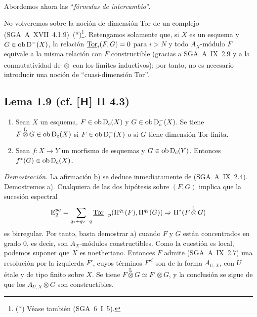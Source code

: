 Abordemos ahora las ``\emph{fórmulas de intercambio}''.

No volveremos sobre la noción de dimensión Tor de un complejo (SGA~A~XVII~4.1.9)~(*)\footnote{(*) Véase también (SGA~6~I~5).}. Retengamos solamente que, si $X$ es un esquema y $G \in \operatorname{ob} \mathrm{D}^{-}(X)$, la relación $\underline{\operatorname{Tor}}_i(F,G) = 0$ para $i > N$ y todo $A_X$-módulo $F$ equivale a la misma relación con $F$ constructible (gracias a SGA~A~IX~2.9 y a la conmutatividad de $\mathop{\otimes}\limits^{\mathrm{L}}$ con los límites inductivos); por tanto, no es necesario introducir una noción de ``cuasi-dimensión Tor''.

\subsection*{Lema 1.9 (cf. [H] II 4.3)}
\begin{enumerate}
\item[a)] Sean $X$ un esquema, $F \in \operatorname{ob} \mathrm{D}_c(X)$ y $G \in \operatorname{ob} \mathrm{D}_c^{-}(X)$. Se tiene $F \mathop{\otimes}\limits^{\mathrm{L}} G \in \operatorname{ob} \mathrm{D}_c(X)$ si $F \in \operatorname{ob} \mathrm{D}_c^{-}(X)$ o si $G$ tiene dimensión Tor finita.
\item[b)] Sean $f : X \to Y$ un morfismo de esquemas y $G \in \operatorname{ob} \mathrm{D}_c(Y)$. Entonces $f^{*}(G) \in \operatorname{ob} \mathrm{D}_c(X)$.
\end{enumerate}

\emph{Demostración.} La afirmación b) se deduce inmediatamente de (SGA~A~IX~2.4). Demostremos a). Cualquiera de las dos hipótesis sobre $(F,G)$ implica que la sucesión espectral
\[
\mathrm{E}_2^{pq} = \sum_{q_1+q_2=q} \underline{\operatorname{Tor}}_{-p}(\mathrm{H}^{q_1}(F), \mathrm{H}^{q_2}(G)) \Rightarrow \mathrm{H}^{*}(F \mathop{\otimes}\limits^{\mathrm{L}} G)
\]
es birregular. Por tanto, basta demostrar a) cuando $F$ y $G$ están concentrados en grado $0$, es decir, son $A_X$-módulos constructibles. Como la cuestión es local, podemos suponer que $X$ es noetheriano. Entonces $F$ admite (SGA~A~IX~2.7) una resolución por la izquierda $F'$, cuyos términos $F'^i$ son de la forma $A_{U,X}$, con $U$ étale y de tipo finito sobre $X$. Se tiene $F \mathop{\otimes}\limits^{\mathrm{L}} G \simeq F' \otimes G$, y la conclusión se sigue de que los $A_{U,X} \otimes G$ son constructibles.
